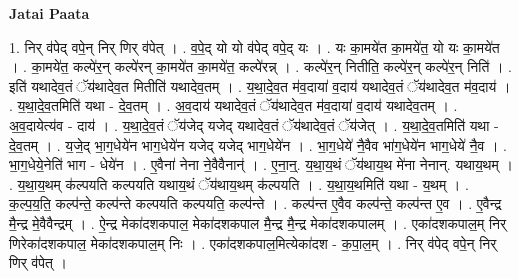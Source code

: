 \documentclass[17pt]{extarticle}
\begin{document}
\textbf{Jatai Paata} \newline

1. निर् व॑पेद् वपे॒न् निर् णिर् व॑पेत् । . व॒पे॒द् यो यो व॑पेद् वपे॒द् यः । . यः का॒मये॑त का॒मये॑त॒ यो यः का॒मये॑त । . का॒मये॑त॒ कल्पे॑र॒न् कल्पे॑रन् का॒मये॑त का॒मये॑त॒ कल्पे॑रन्न् । . कल्पे॑र॒न् नितीति॒ कल्पे॑र॒न् कल्पे॑र॒न् निति॑ । . इति॑ यथादेव॒तं ॅय॑थादेव॒त मितीति॑ यथादेव॒तम् । . य॒था॒दे॒व॒त म॑व॒दाया॑ व॒दाय॑ यथादेव॒तं ॅय॑थादेव॒त म॑व॒दाय॑ । . य॒था॒दे॒व॒तमिति॑ यथा - दे॒व॒तम् । . अ॒व॒दाय॑ यथादेव॒तं ॅय॑थादेव॒त म॑व॒दाया॑ व॒दाय॑ यथादेव॒तम् । . अ॒व॒दायेत्य॑व - दाय॑ । . य॒था॒दे॒व॒तं ॅय॑जेद् यजेद् यथादेव॒तं ॅय॑थादेव॒तं ॅय॑जेत् । . य॒था॒दे॒व॒तमिति॑ यथा - दे॒व॒तम् । . य॒जे॒द् भा॒ग॒धेये॑न भाग॒धेये॑न यजेद् यजेद् भाग॒धेये॑न । . भा॒ग॒धेये॑ नै॒वैव भा॑ग॒धेये॑न भाग॒धेये॑ नै॒व । . भा॒ग॒धेये॒नेति॑ भाग - धेये॑न । . ए॒वैना॑ नेना ने॒वैवैनान्॑ । . ए॒ना॒न्॒. य॒था॒य॒थं ॅय॑थाय॒थ मे॑ना नेनान्. यथाय॒थम् । . य॒था॒य॒थम् क॑ल्पयति कल्पयति यथाय॒थं ॅय॑थाय॒थम् क॑ल्पयति । . य॒था॒य॒थमिति॑ यथा - य॒थम् । . क॒ल्प॒य॒ति॒ कल्प॑न्ते॒ कल्प॑न्ते कल्पयति कल्पयति॒ कल्प॑न्ते । . कल्प॑न्त ए॒वैव कल्प॑न्ते॒ कल्प॑न्त ए॒व । . ए॒वैन्द्र मै॒न्द्र मे॒वैवैन्द्रम् । . ऐ॒न्द्र मेका॑दशकपाल॒ मेका॑दशकपाल मै॒न्द्र मै॒न्द्र मेका॑दशकपालम् । . एका॑दशकपाल॒म् निर् णिरेका॑दशकपाल॒ मेका॑दशकपाल॒म् निः । . एका॑दशकपाल॒मित्येका॑दश - क॒पा॒ल॒म् । . निर् व॑पेद् वपे॒न् निर् णिर् व॑पेत् । \newline
\end{document}
